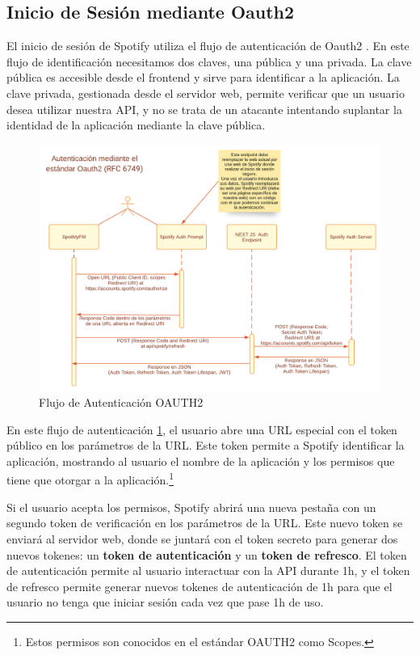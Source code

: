 \subsection{Inicio de Sesión mediante Oauth2}

El inicio de sesión de Spotify utiliza el flujo de autenticación de Oauth2 \cite{oauth2}. En este flujo de identificación necesitamos dos claves, una pública y una privada.
La clave pública es accesible desde el frontend y sirve para identificar a la aplicación. La clave privada, gestionada desde el servidor web, permite verificar que un usuario desea utilizar nuestra API, y no se trata de un atacante intentando suplantar la identidad de la aplicación mediante la clave pública. 

\begin{figure}
    \centering
    \includegraphics{img/C/oauth2.png}
    \caption{Flujo de Autenticación OAUTH2}
    \label{fig:oauth2_flow}
\end{figure}

En este flujo de autenticación \ref{fig:oauth2_flow}, el usuario abre una URL especial con el token público en los parámetros de la URL. Este token permite a Spotify identificar la aplicación, mostrando al usuario el nombre de la aplicación y los permisos que tiene que otorgar a la aplicación.\footnote{Estos permisos son conocidos en el estándar OAUTH2 como Scopes. }

Si el usuario acepta los permisos, Spotify abrirá una nueva pestaña con un segundo token de verificación en los parámetros de la URL. Este nuevo token se enviará al servidor web, donde se juntará con el token secreto para generar dos nuevos tokenes: un \textbf{token de autenticación} y un \textbf{token de refresco}. El token de autenticación permite al usuario interactuar con la API durante 1h, y el token de refresco permite generar nuevos tokenes de autenticación de 1h para que el usuario no tenga que iniciar sesión cada vez que pase 1h de uso.

